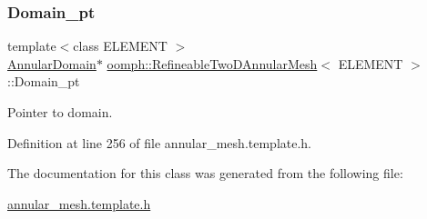 \subsubsection{\texorpdfstring{Domain\+\_\+pt}{Domain\_pt}}
{\footnotesize\ttfamily template$<$class E\+L\+E\+M\+E\+NT $>$ \\
\hyperlink{classoomph_1_1AnnularDomain}{Annular\+Domain}$\ast$ \hyperlink{classoomph_1_1RefineableTwoDAnnularMesh}{oomph\+::\+Refineable\+Two\+D\+Annular\+Mesh}$<$ E\+L\+E\+M\+E\+NT $>$\+::Domain\+\_\+pt\hspace{0.3cm}{\ttfamily [private]}}



Pointer to domain. 



Definition at line 256 of file annular\+\_\+mesh.\+template.\+h.



The documentation for this class was generated from the following file\+:\begin{DoxyCompactItemize}
\item 
\hyperlink{annular__mesh_8template_8h}{annular\+\_\+mesh.\+template.\+h}\end{DoxyCompactItemize}
